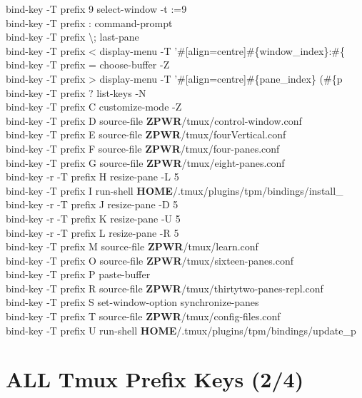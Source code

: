 \documentclass[11pt,a4paper,twoside]{book}
\begin{document}
bind-key  -T prefix  9  select-window -t :=9\\
bind-key  -T prefix  :  command-prompt\\
bind-key  -T prefix  \textbackslash{};  last-pane\\
bind-key  -T prefix  <  display-menu -T '\#[align=centre]\#\{window\_index\}:\#\{\\
bind-key  -T prefix  =  choose-buffer -Z\\
bind-key  -T prefix  >  display-menu -T '\#[align=centre]\#\{pane\_index\} (\#\{p\\
bind-key  -T prefix  ?  list-keys -N\\
bind-key  -T prefix  C  customize-mode -Z\\
bind-key  -T prefix  D  source-file \textbf{ZPWR}/tmux/control-window.conf\\
bind-key  -T prefix  E  source-file \textbf{ZPWR}/tmux/fourVertical.conf\\
bind-key  -T prefix  F  source-file \textbf{ZPWR}/tmux/four-panes.conf\\
bind-key  -T prefix  G  source-file \textbf{ZPWR}/tmux/eight-panes.conf\\
bind-key -r -T prefix  H  resize-pane -L 5\\
bind-key  -T prefix  I  run-shell \textbf{HOME}/.tmux/plugins/tpm/bindings/install\_\\
bind-key -r -T prefix  J  resize-pane -D 5\\
bind-key -r -T prefix  K  resize-pane -U 5\\
bind-key -r -T prefix  L  resize-pane -R 5\\
bind-key  -T prefix  M  source-file \textbf{ZPWR}/tmux/learn.conf\\
bind-key  -T prefix  O  source-file \textbf{ZPWR}/tmux/sixteen-panes.conf\\
bind-key  -T prefix  P  paste-buffer\\
bind-key  -T prefix  R  source-file \textbf{ZPWR}/tmux/thirtytwo-panes-repl.conf\\
bind-key  -T prefix  S  set-window-option synchronize-panes\\
bind-key  -T prefix  T  source-file \textbf{ZPWR}/tmux/config-files.conf\\
bind-key  -T prefix  U  run-shell \textbf{HOME}/.tmux/plugins/tpm/bindings/update\_p\\


\vspace{16pt}

\section{ALL Tmux Prefix Keys (2/4)}
\end{document}
